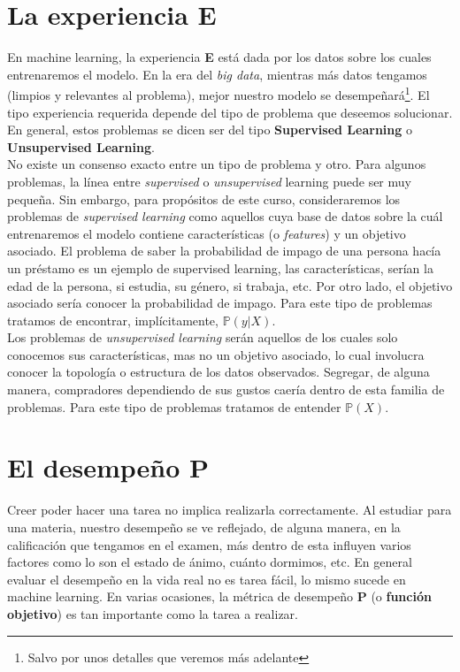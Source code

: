 \documentclass[11pt]{article}
\begin{document}
\section{La experiencia \textbf{E}}
En machine learning, la experiencia \textbf{E} está dada por los datos sobre los cuales entrenaremos el modelo. En la era del \textit{big data}, mientras más datos tengamos (limpios  y relevantes al problema), mejor nuestro modelo se desempeñará\footnote{Salvo por unos detalles que veremos más adelante}. El tipo experiencia requerida depende del tipo de problema que deseemos solucionar. En general, estos problemas se dicen ser del tipo \textbf{Supervised Learning} o \textbf{Unsupervised Learning}.\\

No existe un consenso exacto entre un tipo de problema y otro. Para algunos problemas, la línea entre \textit{supervised} o \textit{unsupervised} learning puede ser muy pequeña. Sin embargo, para propósitos de este curso, consideraremos los problemas de \textit{supervised learning} como aquellos cuya base de datos sobre la cuál entrenaremos el modelo contiene características (o \textit{features}) y un objetivo asociado. El problema de saber la probabilidad de impago de una persona hacía un préstamo es un ejemplo de supervised learning, las características, serían la edad de la persona, si estudia, su género, si trabaja, etc. Por otro lado, el objetivo asociado sería conocer la probabilidad de impago. Para este tipo de problemas tratamos de encontrar, implícitamente, $\mathbb{P}(y|X)$.\\

Los problemas de \textit{unsupervised learning} serán aquellos de los cuales solo conocemos sus características, mas no un objetivo asociado, lo cual involucra conocer la topología o estructura de los datos observados. Segregar, de alguna manera, compradores dependiendo de sus gustos caería dentro de esta familia de problemas. Para este tipo de problemas tratamos de entender $\mathbb{P}(X)$.



\section{El desempeño \textbf{P}}
Creer poder hacer una tarea no implica realizarla correctamente. Al estudiar para una materia, nuestro desempeño se ve reflejado, de alguna manera, en la calificación que tengamos en el examen, más dentro de esta influyen varios factores como lo son el estado de ánimo, cuánto dormimos, etc. En general evaluar el desempeño en la vida real no es tarea fácil, lo mismo sucede en machine learning. En varias ocasiones, la métrica de desempeño \textbf{P} (o \textbf{función objetivo}) es tan importante como la tarea a realizar.\\
\end{document}
